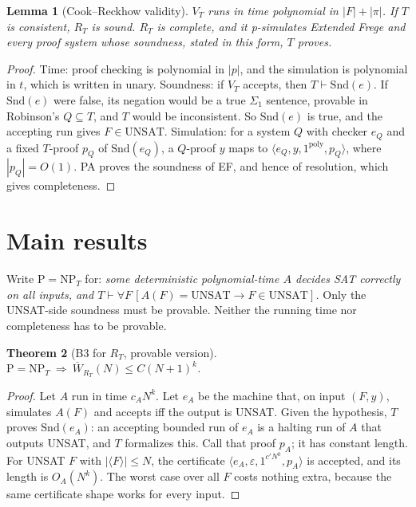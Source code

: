 \documentclass[11pt]{article}
\newtheorem{theorem}{Theorem}
\newtheorem{lemma}[theorem]{Lemma}
\newcommand{\Wb}{\overline W}
\begin{document}
\begin{lemma}[Cook--Reckhow validity]\label{valid}
$V_T$ runs in time polynomial in $|F|+|\pi|$. If $T$ is consistent, $R_T$ is sound. $R_T$ is complete, and it p-simulates Extended Frege and every proof system whose soundness, stated in this form, $T$ proves.
\end{lemma}
\begin{proof}
Time: proof checking is polynomial in $|p|$, and the simulation is polynomial in $t$, which is written in unary. Soundness: if $V_T$ accepts, then $T\vdash \mathrm{Snd}(e)$. If $\mathrm{Snd}(e)$ were false, its negation would be a true $\Sigma_1$ sentence, provable in Robinson's $Q\subseteq T$, and $T$ would be inconsistent. So $\mathrm{Snd}(e)$ is true, and the accepting run gives $F\in\mathrm{UNSAT}$. Simulation: for a system $Q$ with checker $e_Q$ and a fixed $T$-proof $p_Q$ of $\mathrm{Snd}(e_Q)$, a $Q$-proof $y$ maps to $\langle e_Q,y,1^{\mathrm{poly}},p_Q\rangle$, where $|p_Q|=O(1)$. PA proves the soundness of EF, and hence of resolution, which gives completeness.
\end{proof}

\section{Main results}
Write $\mathrm{P{=}NP}_T$ for: \emph{some deterministic polynomial-time $A$ decides SAT correctly on all inputs, and $T\vdash\forall F\,[A(F)=\mathrm{UNSAT}\rightarrow F\in\mathrm{UNSAT}]$.} Only the UNSAT-side soundness must be provable. Neither the running time nor completeness has to be provable.

\begin{theorem}[B3 for $R_T$, provable version]\label{b3t}
$\mathrm{P{=}NP}_T\ \Longrightarrow\ \Wb_{R_T}(N)\le C(N+1)^k$.
\end{theorem}
\begin{proof}
Let $A$ run in time $c_AN^k$. Let $e_A$ be the machine that, on input $(F,y)$, simulates $A(F)$ and accepts iff the output is UNSAT. Given the hypothesis, $T$ proves $\mathrm{Snd}(e_A)$: an accepting bounded run of $e_A$ is a halting run of $A$ that outputs UNSAT, and $T$ formalizes this. Call that proof $p_A$; it has constant length. For UNSAT $F$ with $|\langle F\rangle|\le N$, the certificate $\langle e_A,\varepsilon,1^{c'N^{k}},p_A\rangle$ is accepted, and its length is $O_A(N^k)$. The worst case over all $F$ costs nothing extra, because the same certificate shape works for every input.
\end{proof}
\end{document}

